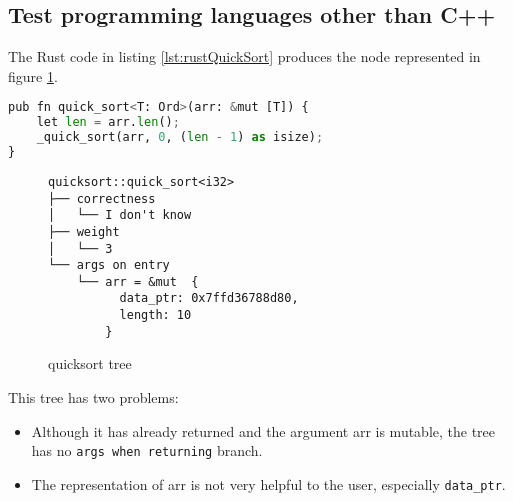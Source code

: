 \subsection{Test programming languages other than C++}
The Rust code in listing \ref{lst:rustQuickSort} produces the node represented in figure \ref{fig:rustQuickSortTree}.
\begin{lstlisting}[language=Python, caption=QuickSort in Rust, frame=tb, label={lst:rustQuickSort}]
pub fn quick_sort<T: Ord>(arr: &mut [T]) {
    let len = arr.len();
    _quick_sort(arr, 0, (len - 1) as isize);
}
\end{lstlisting}
\begin{figure}[h]
\caption{quicksort tree}
\label{fig:rustQuickSortTree}
\begin{verbatim}
quicksort::quick_sort<i32>                                                                                                                            
├── correctness                                                                                                                                       
│   └── I don't know                                                                                                                                  
├── weight                                                                                                                                            
│   └── 3                                                                                                                                             
└── args on entry                                                                                                                                     
    └── arr = &mut  {                                                                                                                                 
          data_ptr: 0x7ffd36788d80,                                                                                                                   
          length: 10                                                                                                                                  
        }
\end{verbatim}
\end{figure}
This tree has two problems:
\begin{itemize}
    \item Although it has already returned and the argument arr is mutable, the tree has no \verb|args when returning| branch.
    \item The representation of arr is not very helpful to the user, especially \verb|data_ptr|.
\end{itemize}
